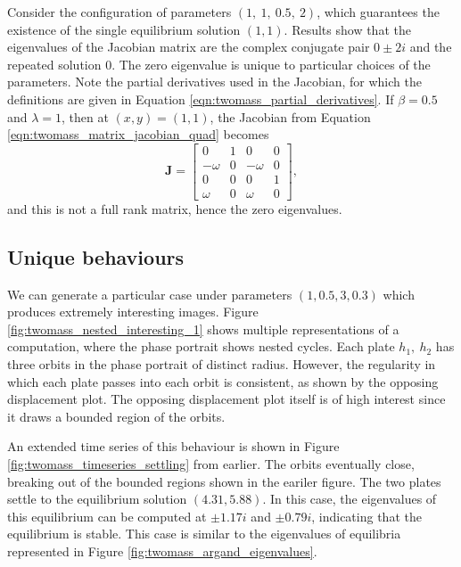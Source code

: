 Consider the configuration of parameters \((1,~1,~0.5,~2)\),
which guarantees the existence of the single equilibrium solution \((1,1)\).
Results show that the eigenvalues of the Jacobian matrix are the complex conjugate pair $ 0 \pm 2i$ and the repeated solution $0$.  %
The zero eigenvalue is unique to particular choices of the parameters.
Note the partial derivatives used in the Jacobian, for which the definitions are given in Equation \ref{eqn:twomass_partial_derivatives}.
If $\beta = 0.5$ and $\lambda = 1$, then at \((x,y) = (1,1)\),
the Jacobian from Equation \ref{eqn:twomass_matrix_jacobian_quad} becomes
\begin{equation*}
	\mathbf{J} = \begin{bmatrix}
		0 & 1 & 0 & 0 \\
		-\omega & 0 & -\omega & 0 \\
		0 & 0 & 0 & 1 \\
		\omega & 0 & \omega & 0
	\end{bmatrix},
\end{equation*}
and this is not a full rank matrix, hence the zero eigenvalues.

\subsection{Unique behaviours}

We can generate a particular case under parameters \((1,0.5,3,0.3)\) which produces extremely interesting images.
Figure \ref{fig:twomass_nested_interesting_1} shows multiple representations of a computation,
where the phase portrait shows nested cycles.
Each plate $h_1,~h_2$ has three orbits in the phase portrait of distinct radius.
However, the regularity in which each plate passes into each orbit is consistent,
as shown by the opposing displacement plot.
The opposing displacement plot itself is of high interest since it draws a bounded region of the orbits.

An extended time series of this behaviour is shown in Figure \ref{fig:twomass_timeseries_settling} from earlier.
The orbits eventually close, breaking out of the bounded regions shown in the eariler figure.
The two plates settle to the equilibrium solution \((4.31,5.88)\).
In this case, the eigenvalues of this equilibrium can be computed at $\pm 1.17i$ and $\pm 0.79i$,
indicating that the equilibrium is stable.
This case is similar to the eigenvalues of equilibria represented in Figure \ref{fig:twomass_argand_eigenvalues}.

